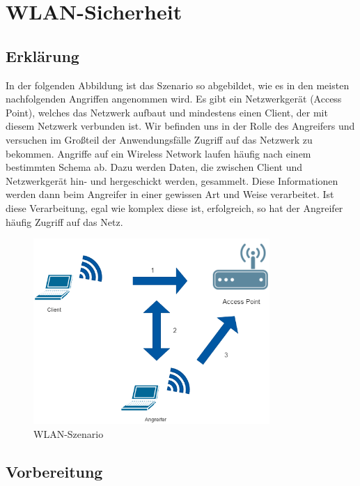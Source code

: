 
\chapter{WLAN-Sicherheit}

\section{Erklärung}

In der folgenden Abbildung ist das Szenario so abgebildet, wie es in den meisten nachfolgenden
Angriffen angenommen wird. Es gibt ein Netzwerkgerät (Access Point), welches das Netzwerk
aufbaut und mindestens einen Client, der mit diesem Netzwerk verbunden ist. Wir befinden
uns in der Rolle des Angreifers und versuchen im Großteil der Anwendungsfälle Zugriff auf
das Netzwerk zu bekommen.
Angriffe auf ein Wireless Network laufen häufig nach einem bestimmten Schema ab. Dazu
werden Daten, die zwischen Client und Netzwerkgerät hin- und hergeschickt werden,
gesammelt. Diese Informationen werden dann beim Angreifer in einer gewissen Art und
Weise verarbeitet. Ist diese Verarbeitung, egal wie komplex diese ist, erfolgreich, so hat der
Angreifer häufig Zugriff auf das Netz.

\begin{figure}[H]
	\centering
	\includegraphics[width=0.8\textwidth]{images/WLAN/WLANSzenario.png}
	\caption{WLAN-Szenario}
	\label{fig:WLAN-Szenario}
\end{figure}

\section{Vorbereitung}


